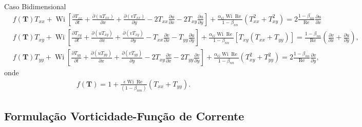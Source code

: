 \begin{frame}{Caso Bidimensional}
\small{
\begin{subequations}
\begin{align}
    & f(\mathbf{T}) T_{xx} + \operatorname{Wi}\left[\frac{\partial T_{xx}}{\partial t} + \frac{\partial (uT_{xx})}{\partial x} + \frac{\partial (vT_{xx})}{\partial y} - 2T_{xx}\frac{\partial u}{\partial x} - 2T_{xy}\frac{\partial u}{\partial y}\right] + \frac{\alpha_{G}\operatorname{Wi}\operatorname{Re}}{1 - \beta_{nn}}\left(T_{xx}^{2} + T_{xy}^{2}\right) = 2 \frac{1 - \beta_{nn}}{\operatorname{Re}}\frac{\partial u}{\partial x}\\
    & f(\mathbf{T}) T_{xy} + \operatorname{Wi}\left[\frac{\partial T_{xy}}{\partial t} + \frac{\partial (uT_{xy})} {\partial x} + \frac{\partial (vT_{xy})}{\partial y} - T_{xx}\frac{\partial v}{\partial x} - T_{yy}\frac{\partial u}{\partial y}\right] + \frac{\alpha_{G}\operatorname{Wi}\operatorname{Re}}{1 - \beta_{nn}}\left[T_{xy}\left(T_{xx} + T_{yy}\right)\right]  = \frac{1 - \beta_{nn}}{\operatorname{Re}}\left(\frac{\partial v}{\partial x} + \frac{\partial u}{\partial y}\right),\\
    & f(\mathbf{T})T_{yy} + \operatorname{Wi}\left[\frac{\partial T_{yy}}{\partial t} + \frac{\partial (uT_{yy})}{\partial x} + \frac{\partial (vT_{yy})}{\partial y} - 2T_{xy}\frac{\partial v}{\partial x} - 2T_{yy}\frac{\partial v}{\partial y}\right] + \frac{\alpha_{G}\operatorname{Wi}\operatorname{Re}}{1 - \beta_{nn}}\left(T_{xy}^{2} + T_{yy}^{2}\right) = 2\frac{1 - \beta_{nn}}{\operatorname{Re}}\frac{\partial v}{\partial y},
\end{align}
\end{subequations}}
\normalsize
onde
\begin{equation*}
    \begin{split}
        f(\mathbf{T}) = 1+\frac{\epsilon \operatorname{Wi} \operatorname{Re}}{(1 - \beta_{nm})}\left(T_{xx} + T_{yy}\right).
    \end{split}\label{eq_funcao_traco_tensor_bidime}
\end{equation*}
\end{frame}

\subsection{Formulação Vorticidade-Função de Corrente}

